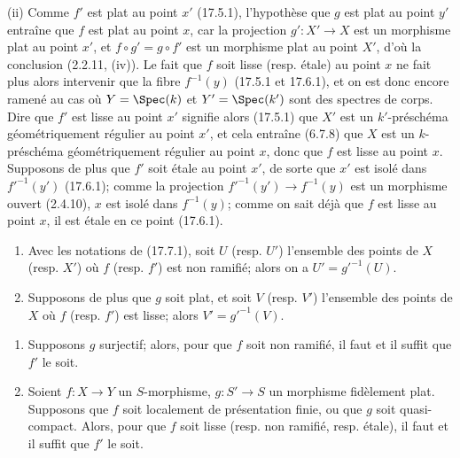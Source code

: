 (ii) Comme $f'$ est plat au point $x'$ (17.5.1), l'hypothèse que $g$ est plat au point $y'$ entraîne que $f$ est plat au point $x$, car la projection $g':X'\to X$ est un morphisme plat au point $x'$, et $f\circ g'=g\circ f'$ est un morphisme plat au point $X'$, d'où la conclusion (2.2.11, (iv)). Le fait que $f$ soit lisse (resp. étale) au point $x$ ne fait plus alors intervenir que la fibre $f^{-1}(y)$ (17.5.1 et 17.6.1), et on est donc encore ramené au cas où $Y=\Spec(k)$ et $Y'=\Spec(k')$ sont des spectres de corps. Dire que $f'$ est lisse au point $x'$ signifie alors (17.5.1) que $X'$ est un $k'$-préschéma géométriquement régulier au point $x'$, et cela entraîne (6.7.8) que $X$ est un $k$-préschéma géométriquement régulier au point $x$, donc que $f$ est lisse au point $x$. Supposons de plus que $f'$ soit étale au point $x'$, de sorte que $x'$ est isolé dans $f'^{-1}(y')$ (17.6.1); comme la projection $f'^{-1}(y')\to f^{-1}(y)$ est un morphisme ouvert (2.4.10), $x$ est isolé dans $f^{-1}(y)$; comme on sait déjà que $f$ est lisse au point $x$, il est étale en ce point (17.6.1).

\begin{corollary}[17.7.2]
\label{IV.17.7.2}
\begin{enumerate}
  \item[(i)] Avec les notations de (17.7.1), soit $U$ (resp. $U'$) l'ensemble des points de $X$ (resp. $X'$) où $f$ (resp. $f'$) est non ramifié; alors on a $U'=g'^{-1}(U)$.
  \item[(ii)] Supposons de plus que $g$ soit plat, et soit $V$ (resp. $V'$) l'ensemble des points de $X$ où $f$ (resp. $f'$) est lisse; alors $V'=g'^{-1}(V)$.
\end{enumerate}
\end{corollary}

\begin{corollary}[17.7.3]
\label{IV.17.7.3}
\begin{enumerate}
  \item[(i)] Supposons $g$ surjectif; alors, pour que $f$ soit non ramifié, il faut et il suffit que $f'$ le soit.
  \item[(ii)] Soient $f:X\to Y$ un $S$-morphisme, $g:S'\to S$ un morphisme fidèlement plat. Supposons que $f$ soit localement de présentation finie, ou que $g$ soit quasi-compact. Alors, pour que $f$ soit lisse (resp. non ramifié, resp. étale), il faut et il suffit que $f'$ le soit.
\end{enumerate}
\end{corollary}

